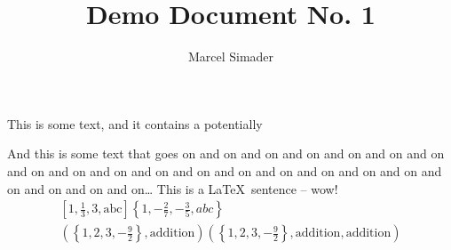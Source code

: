 \documentclass[a4paper, 12pt]{article}
\title{Demo Document No. 1\\[0.4em]\smaller{for the SEPTeX module}}
\author{Marcel Simader}
\date{}
\begin{document}
	\maketitle
	
	\noindent This is some text, and it contains a potentially %
	
	And this is some text that goes on and on and on and on and on and on and on and on and on and on and on and on and on 
		and on and on and on and on and on and on and on and on\ldots
	This is a \LaTeX\ sentence -- wow!
	\begin{gather*}
		\left[ 1, \frac{1}{3}, 3, \text{abc} \right]
		\left\{ 1, -\frac{2}{7}, -\frac{3}{5}, abc \right\}
		\\
		\left( \left\{ 1, 2, 3, -\frac{9}{2} \right\}, \text{addition} \right)
		\left( \left\{ 1, 2, 3, -\frac{9}{2} \right\}, \text{addition}, \text{addition} \right)
	\end{gather*}
	
	\newpage
	
\end{document}
